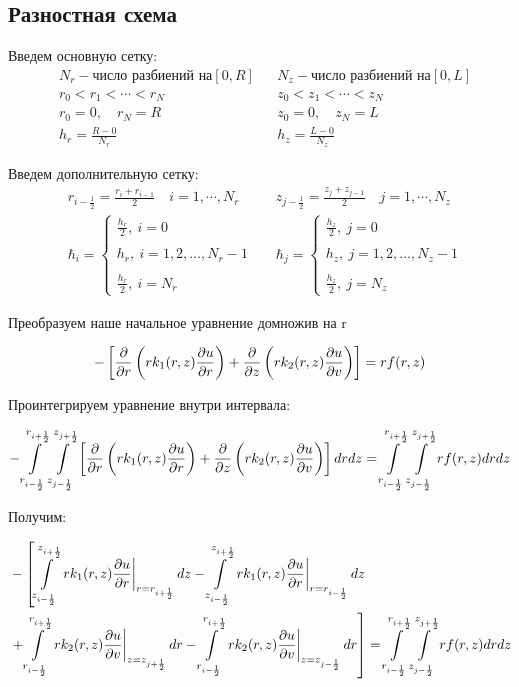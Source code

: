 \subsection{Разностная схема}
Введем основную сетку:
\begin{align*}
  &N_r - \text{число разбиений на} [0, R] & &N_z - \text{число разбиений на} [0, L] \\
  &r_0 < r_1 < \cdots < r_N & &z_0 < z_1 < \cdots < z_N \\
  &r_0 = 0,\quad r_N = R & &z_0 = 0,\quad z_N = L \\
  &h_r = \frac{R - 0}{N_r} & &h_z = \frac{L - 0}{N_z}
\end{align*}

Введем дополнительную сетку:
\begin{align*}
  &r_{i-\frac{1}{2}} = \frac{r_i + r_{i - 1}}{2}\quad i=1,\cdots, N_r & &z_{j-\frac{1}{2}} = \frac{z_j + z_{j - 1}}{2}\quad j=1,\cdots, N_z \\
  & \hbar_i = \begin{cases}
    \frac{h_r}{2},\ i = 0 \\ \\
    h_r,\ i = 1, 2, \dots, N_r-1 \\ \\
    \frac{h_r}{2},\ i = N_r
  \end{cases} &
  & \hbar_j = \begin{cases}
    \frac{h_z}{2},\ j = 0 \\ \\
    h_z,\ j = 1, 2, \dots, N_z-1 \\ \\
    \frac{h_z}{2},\ j = N_z
  \end{cases}
\end{align*}

Преобразуем наше начальное уравнение домножив на r

\[
  - \left [ \pdv{}{r} \left ( r k_1(r, z) \pdv{u}{r} \right ) 
  + \pdv{}{z} \left ( rk_2(r, z)\pdv{u}{v} \right ) \right ] = rf(r, z)
\]

Проинтегрируем уравнение внутри интервала:

\[
  - \int\limits^{r_{i +\frac{1}{2}}}_{r_{i -\frac{1}{2}}} \int\limits^{z_{j +\frac{1}{2}}}_{z_{j -\frac{1}{2}}} \left [ \pdv{}{r} \left ( r k_1(r, z) \pdv{u}{r} \right ) 
  + \pdv{}{z} \left ( rk_2(r, z)\pdv{u}{v} \right ) \right ] dr dz = \int\limits^{r_{i +\frac{1}{2}}}_{r_{i -\frac{1}{2}}} \int\limits^{z_{j +\frac{1}{2}}}_{z_{j -\frac{1}{2}}} rf(r, z) dr dz
\]

Получим:

\begin{align*}
  &- \left [
   \int\limits^{z_{i+\frac{1}{2}}}_{z_{i-\frac{1}{2}}}  \left . r k_1(r, z) \pdv{u}{r} \right \vert_{r = r_{i + \frac{1}{2}}} dz
  - \int\limits^{z_{i+\frac{1}{2}}}_{z_{i-\frac{1}{2}}} \left . r k_1(r, z) \pdv{u}{r} \right \vert_{r = r_{i - \frac{1}{2}}} dz
  \right . \\
  &\left . + \int\limits^{r_{i+\frac{1}{2}}}_{r_{i-\frac{1}{2}}} \left . rk_2(r, z)\pdv{u}{v} \right \vert_{z = z_{j + \frac{1}{2}}} dr
  - \int\limits^{r_{i+\frac{1}{2}}}_{r_{i-\frac{1}{2}}} \left . rk_2(r, z)\pdv{u}{v} \right \vert_{z = z_{j - \frac{1}{2}}} dr
  \right ] = \int\limits^{r_{i +\frac{1}{2}}}_{r_{i -\frac{1}{2}}} \int\limits^{z_{j +\frac{1}{2}}}_{z_{j -\frac{1}{2}}} rf(r, z) dr dz
\end{align*}


